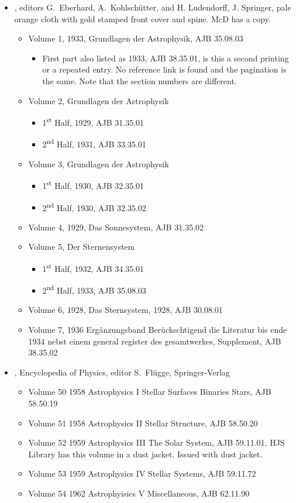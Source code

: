\begin{itemize}
\item {}, editors G.\ Eberhard,
  A.\ Kohlsch\"{u}tter, and H. Ludendorff, J. Springer, pale orange
  cloth with gold stamped front cover and spine. McD has a copy.
  \begin{itemize}
  \item Volume 1, 1933, Grundlagen der Astrophysik, AJB 35.08.03
    \begin{itemize}
    \item First part also listed as 1933, AJB 38.35.01, is this a
      second printing or a repeated entry.  No reference link is found
      and the pagination is the same. Note that the section numbers
      are different.
      \end{itemize}
  \item Volume 2, Grundlagen der Astrophysik
    \begin{itemize}
    \item 1\textsuperscript{st} Half, 1929, AJB 31.35.01
    \item 2\textsuperscript{nd} Half, 1931, AJB 33.35.01
    \end{itemize}
  \item Volume 3, Grundlagen der Astrophysik
    \begin{itemize}
    \item 1\textsuperscript{st} Half, 1930, AJB 32.35.01
    \item 2\textsuperscript{nd} Half, 1930, AJB 32.35.02
    \end{itemize}
  \item Volume 4, 1929,  Das Sonnesystem, AJB 31.35.02
  \item Volume 5, Der Sternensystem
    \begin{itemize}
    \item 1\textsuperscript{st} Half, 1932, AJB 34.35.01
    \item 2\textsuperscript{nd} Half, 1933, AJB 35.08.03
    \end{itemize}
  \item Volume 6, 1928, Das Sternsystem, 1928, AJB 30.08.01
  \item Volume 7, 1936 Erg\"{a}nzungsband Ber\"{u}ckschtigend die
    Literatur bis ende 1934 nebst einem general register des
    gesamtwerkes, Supplement, AJB 38.35.02
  \end{itemize}

\item {}, Encyclopedia of Physics, editor
  S.\ Fl\"{u}gge, Springer-Verlag
  \begin{itemize}
  \item Volume 50 1958 Astrophysics I Stellar Surfaces Binaries Stars,
    AJB 58.50.19
  \item Volume 51 1958 Astrophysics II Stellar Structure, AJB 58.50.20
  \item Volume 52 1959 Astrophysics III The Solar System, AJB
    59.11.01, HJS Library has this volume in a dust jacket. Issued
    with dust jacket.
  \item Volume 53 1959 Astrophysics IV Stellar Systems, AJB 59.11.72
  \item Volume 54 1962 Astrophyisics V Miscellaneous, AJB 62.11.90


\end{itemize}
\end{itemize}
